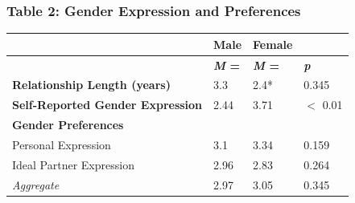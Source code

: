 \hypertarget{table-2}
  {\subsubsection[Table 2: Gender Expression \texorpdfstring{\\}{} and Preferences]{Table 2: Gender Expression and Preferences}}

\begin{longtable}[]{@{}llll@{}}
 \toprule
                                          & \textbf{Male}       & \textbf{Female}      & \tabularnewline
 \midrule
 \endhead
                                          & \textbf{\emph{M} =} & \textbf{\emph{M} =~} &
 \emph{\textbf{p}}\tabularnewline
 \textbf{Relationship Length (years)}     & 3.3                 & 2.4*                 & 0.345\tabularnewline
 \textbf{Self-Reported Gender Expression} & 2.44                & 3.71                 & $<$ 0.01\tabularnewline
 \textbf{Gender Preferences}              &                     &                      & \tabularnewline
 Personal Expression                      & 3.1                 & 3.34                 & 0.159\tabularnewline
 Ideal Partner Expression                 & 2.96                & 2.83                 & 0.264\tabularnewline
 \emph{Aggregate}                         & 2.97                & 3.05                 & 0.345\tabularnewline
 \bottomrule
\end{longtable}

